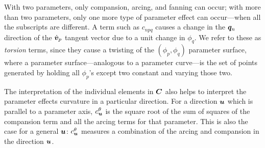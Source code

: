 With two parameters, only compansion, arcing, and fanning can
occur;  with more than two parameters, only one more type of
parameter effect can occur---when all the subscripts are
different.
A term such as $c_{npq}$ causes a change in the ${\boldsymbol q}_{n}$
direction of the $\dot {{\boldsymbol v}}_{p}$ tangent vector due to a unit
change in $\phi_{q}$.
We refer to these as {\em torsion\/} terms, since they cause a
twisting of the $( \phi_p , \phi_q )$ parameter surface,
where a parameter surface---analogous to a parameter curve---is
the set of points generated by holding all $\phi_{p}$'s except
two constant and varying those two.

The interpretation of the individual elements in ${\boldsymbol C}$ also helps to
interpret the parameter effects curvature in a particular
direction.
For a direction ${\boldsymbol u}$ which is parallel to a parameter axis,
$c_{{\boldsymbol u}}^{\theta}$ is the square root of the sum of squares of
the compansion term and all the arcing terms for that parameter.
This is also the case for a general ${\boldsymbol u}$:  $c_{{\boldsymbol u}}^{\theta}$
measures a combination of the arcing and compansion in the
direction ${\boldsymbol u}$.
\label{bod:4}
